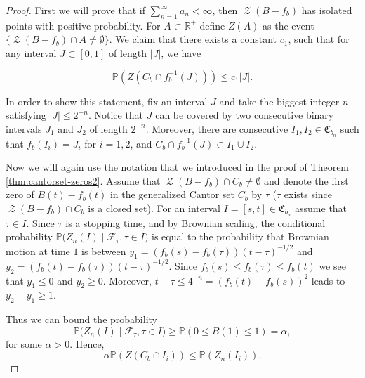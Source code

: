\documentclass[11pt,reqno]{amsart}
\theoremstyle{plain}
\theoremstyle{definition}
\theoremstyle{remark}
\begin{document}
\begin{proof}
First we will prove that if $\sum_{n=1}^{\infty} a_n < \infty$, then $\operatorname{\mathcal{Z}}(B-f_b)$ has isolated points with positive probability.
For $A \subset \mathbb{R}^+$ define $Z(A)$ as the event $\{\operatorname{\mathcal{Z}}(B-f_b) \cap A \neq \emptyset\}$.
We claim that there exists a constant $c_1$, such that for any interval $J \subset [0,1]$ of length $|J|$, we have

\begin{equation}\label{eq:cuts_probabilities2}
\mathbb{P}(Z(C_b \cap f_b^{-1}(J))) \leq c_1 |J|.
\end{equation}

In order to show this statement, fix an interval $J$ and take the biggest integer $n$ satisfying $|J| \leq 2^{-n}$. Notice that $J$ can be covered by two consecutive binary intervals $J_1$ and $J_2$ of length $2^{-n}$.
Moreover, there are consecutive $I_1,I_2 \in \mathfrak{C}_{b_n}$ such that $f_b(I_i) = J_i$ for  $i=1,2$,
and $C_b \cap  f_b^{-1}(J) \subset I_1 \cup I_2$. 

Now we will again use the notation that we introduced in the proof of Theorem \ref{thm:cantorset-zeros2}.
Assume that $\operatorname{\mathcal{Z}}(B-f_b)\cap C_b \neq \emptyset$ and denote the first zero of $B(t)-f_b(t)$ in the generalized Cantor set $C_b$ by $\tau$ ($\tau$ exists since $\operatorname{\mathcal{Z}}(B-f_b)\cap C_b$ is a closed set). For an interval $I = [s,t] \in \mathfrak{C}_{b_n}$ assume that $\tau \in I$. Since $\tau$ is a stopping time, and by Brownian scaling, the conditional probability $\mathbb{P}\Big(Z_n(I) \mid \mathcal{F}_\tau, \tau \in I\Big)$ is equal to the probability that Brownian motion at time $1$ is between $y_1=(f_b(s)-f_b(\tau))(t-\tau)^{-1/2}$ and $y_2=(f_b(t)-f_b(\tau))(t-\tau)^{-1/2}$. Since $f_b(s) \leq f_b(\tau) \leq f_b(t)$ we see that $y_1 \leq 0$ and $y_2 \geq 0$. Moreover, $t-\tau \leq 4^{-n} = (f_b(t)-f_b(s))^2$ leads to $y_2-y_1 \geq 1$.

Thus we can bound the probability
\begin{equation}\label{eq: approximation of probabilities_1-5}
\mathbb{P}\Big(Z_n(I)
\mid
 \mathcal{F}_\tau, \tau \in I \Big) 
\geq \mathbb{P}(0 \leq  B(1) \leq 1) = \alpha,
\end{equation}
 for some $\alpha>0$. 
Hence,
\begin{equation} \label{eq:approximation_by_diagonals_for_small_gamma}
{\alpha}\mathbb{P}(Z(C_b \cap I_i)) \leq  \mathbb{P}(Z_n(I_i)).
\end{equation}


\end{proof}
\end{document}
